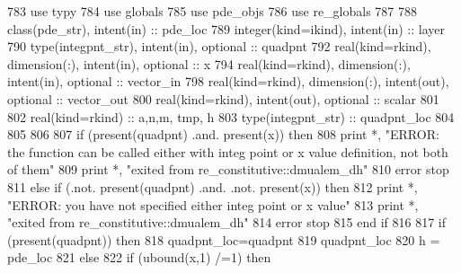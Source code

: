 \begin{DoxyCode}
783       \textcolor{keywordtype}{use }typy
784       \textcolor{keywordtype}{use }globals
785       \textcolor{keywordtype}{use }pde_objs
786       \textcolor{keywordtype}{use }re_globals
787 
788       \textcolor{keywordtype}{class}(pde_str), \textcolor{keywordtype}{intent(in)} :: pde\_loc
789       \textcolor{keywordtype}{integer(kind=ikind)}, \textcolor{keywordtype}{intent(in)} :: layer
790       \textcolor{keywordtype}{type}(integpnt_str), \textcolor{keywordtype}{intent(in)}, \textcolor{keywordtype}{optional} :: quadpnt    
792       \textcolor{keywordtype}{real(kind=rkind)}, \textcolor{keywordtype}{dimension(:)}, \textcolor{keywordtype}{intent(in)}, \textcolor{keywordtype}{optional} :: x
794       \textcolor{keywordtype}{real(kind=rkind)}, \textcolor{keywordtype}{dimension(:)}, \textcolor{keywordtype}{intent(in)}, \textcolor{keywordtype}{optional} :: vector\_in
798       \textcolor{keywordtype}{real(kind=rkind)}, \textcolor{keywordtype}{dimension(:)}, \textcolor{keywordtype}{intent(out)}, \textcolor{keywordtype}{optional} :: vector\_out
800       \textcolor{keywordtype}{real(kind=rkind)}, \textcolor{keywordtype}{intent(out)}, \textcolor{keywordtype}{optional} :: scalar
801 
802       \textcolor{keywordtype}{real(kind=rkind)} :: a,n,m, tmp, h
803       \textcolor{keywordtype}{type}(integpnt_str) :: quadpnt\_loc     
804       
805          
806       
807       \textcolor{keywordflow}{if} (\textcolor{keyword}{present}(quadpnt) .and. \textcolor{keyword}{present}(x)) \textcolor{keywordflow}{then}
808         print *, \textcolor{stringliteral}{"ERROR: the function can be called either with integ point or x value definition, not both
       of them"}
809         print *, \textcolor{stringliteral}{"exited from re\_constitutive::dmualem\_dh"}
810         error stop
811       \textcolor{keywordflow}{else} \textcolor{keywordflow}{if} (.not. \textcolor{keyword}{present}(quadpnt) .and. .not. \textcolor{keyword}{present}(x)) \textcolor{keywordflow}{then}
812         print *, \textcolor{stringliteral}{"ERROR: you have not specified either integ point or x value"}
813         print *, \textcolor{stringliteral}{"exited from re\_constitutive::dmualem\_dh"}
814         error stop
815 \textcolor{keywordflow}{      end if}
816       
817       \textcolor{keywordflow}{if} (\textcolor{keyword}{present}(quadpnt)) \textcolor{keywordflow}{then}
818         quadpnt\_loc=quadpnt
819         quadpnt\_loc%
820         h = pde\_loc%
821       \textcolor{keywordflow}{else}
822         \textcolor{keywordflow}{if} (ubound(x,1) /=1) \textcolor{keywordflow}{then}

\end{DoxyCode}
